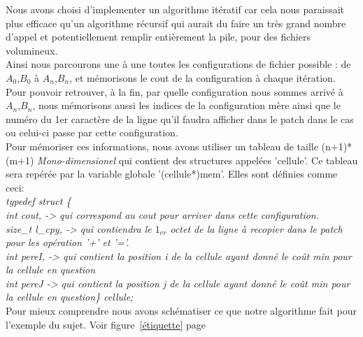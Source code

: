 \documentclass[a4paper, 10pt, french]{article}
\begin{document}
{Nous avons choisi d'implementer un algorithme itératif car cela nous paraissait plus efficace qu'un algorithme récursif qui aurait du faire un très grand nombre d'appel et potentiellement remplir entièrement la pile, pour des fichiers volumineux.
\\ \indent Ainsi nous parcourons une à une toutes les configurations de fichier possible : de $A_0$,$B_0$ à $A_n$,$B_n$, et mémorisons le cout de la configuration à chaque itération.
\\ \indent Pour pouvoir retrouver, à la fin, par quelle configuration nous sommes arrivé à $A_n$,$B_n$, nous mémorisons aussi les indices de la configuration mère ainsi que le numéro du 1er caractère de la ligne qu'il faudra afficher dans le patch dans le cas ou celui-ci passe par cette configuration.
\\ \indent Pour mémoriser ces informations, nous avons utiliser un tableau de taille (n+1)*(m+1) {\em Mono-dimensionel} qui contient des structures appelées 'cellule'. Ce tableau sera repérée par la variable globale '(cellule*)mem'. Elles sont définies comme ceci:
{\em \\typedef struct  \{
\\ \indent int cout, -> qui correspond au cout pour arriver dans cette configuration.
\\ \indent size\_t l\_cpy, -> qui contiendra le $1_{er}$ octet de la ligne à recopier dans le patch pour les opération '+' et '='.
\\ \indent int pereI, -> qui contient la position i de la cellule ayant donné le coût min pour la cellule en question
\\ \indent int pereJ -> qui contient la position j de la cellule ayant donné le coût min pour la cellule en question\} cellule;}
\\ \indent Pour mieux comprendre nous avons schématiser ce que notre algorithme fait pour l'exemple du sujet. Voir figure~\ref{étiquette} page~\pageref{étiquette} 

}
\end{document}
